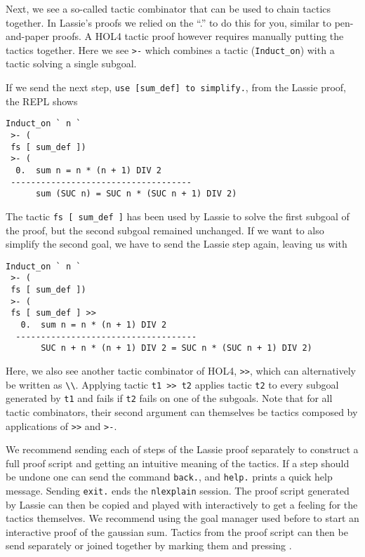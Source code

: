 Next, we see a so-called tactic combinator that can be used to chain tactics
together.
In Lassie's proofs we relied on the ``.'' to do this for you, similar to
pen-and-paper proofs.
A HOL4 tactic proof however requires manually putting the tactics together.
Here we see \lstinline{>-} which combines a tactic (\lstinline{Induct_on})
with a tactic solving a single subgoal.

If we send the next step, \lstinline{use [sum_def] to simplify.}, from the Lassie proof, the REPL shows
%
\begin{lstlisting}[frame=single]
Induct_on ` n `
 >- (
 fs [ sum_def ])
 >- (
  0.  sum n = n * (n + 1) DIV 2
 ------------------------------------
      sum (SUC n) = SUC n * (SUC n + 1) DIV 2)
\end{lstlisting}

The tactic \lstinline{fs [ sum_def ]} has been used by Lassie to solve the first subgoal
of the proof, but the second subgoal remained unchanged.
If we want to also simplify the second goal, we have to send the Lassie step again,
leaving us with
%
\begin{lstlisting}[frame=single]
Induct_on ` n `
 >- (
 fs [ sum_def ])
 >- (
 fs [ sum_def ] >>
   0.  sum n = n * (n + 1) DIV 2
  ------------------------------------
       SUC n + n * (n + 1) DIV 2 = SUC n * (SUC n + 1) DIV 2)
\end{lstlisting}

Here, we also see another tactic combinator of HOL4, \lstinline{>>}, which can
alternatively be written as \lstinline{\\}.
Applying tactic \lstinline{t1 >> t2} applies tactic \lstinline{t2} to every
subgoal  generated by \lstinline{t1} and fails if \lstinline{t2} fails on one of
the subgoals.
Note that for all tactic combinators, their second argument can themselves be
tactics composed by applications of \lstinline{>>} and \lstinline{>-}.

We recommend sending each of steps of the Lassie proof separately to construct a
full proof script and getting an intuitive meaning of the tactics.
If a step should be undone one can send the command \lstinline{back.}, and
\lstinline{help.} prints a quick help message.
Sending \lstinline{exit.} ends the \lstinline{nlexplain} session.
The proof script generated by Lassie can then be copied and played with
interactively to get a feeling for the tactics themselves.
We recommend using the goal manager used before to start an interactive proof of
the gaussian sum.
Tactics from the proof script can then be send separately or joined together by
marking them and pressing .